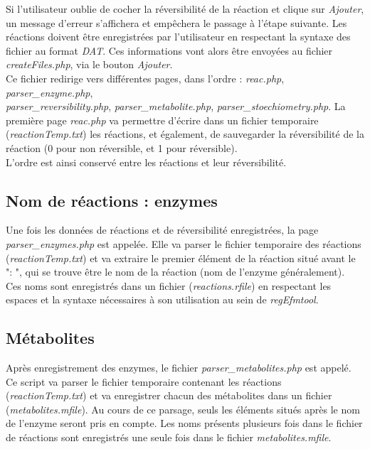 Si l'utilisateur oublie de cocher la réversibilité de la réaction et clique sur \emph{Ajouter}, un message d'erreur s'affichera et empêchera le passage à l'étape suivante. Les réactions doivent être enregistrées par l'utilisateur en respectant la syntaxe des fichier au format \emph{DAT}. Ces informations vont alors être envoyées au fichier \emph{createFiles.php}, via le bouton \emph{Ajouter}.\\
Ce fichier redirige vers différentes pages, dans l'ordre : \emph{reac.php}, \emph{parser\_enzyme.php},
\\ \emph{parser\_reversibility.php}, \emph{parser\_metabolite.php}, \emph{parser\_stoechiometry.php}.
La première page \emph{reac.php} va permettre d'écrire dans un fichier temporaire (\emph{reactionTemp.txt}) les réactions, et également, de sauvegarder la réversibilité de la réaction (0 pour non réversible, et 1 pour réversible).\\
L'ordre est ainsi conservé entre les réactions et leur réversibilité.

\subsection{Nom de réactions : enzymes}
Une fois les données de réactions et de réversibilité enregistrées, la page \emph{parser\_enzymes.php} est appelée. Elle va parser le fichier temporaire des réactions (\emph{reactionTemp.txt}) et va extraire le premier élément de la réaction situé avant le ": ", qui se trouve être le nom de la réaction (nom de l'enzyme généralement).\\
Ces noms sont enregistrés dans un fichier (\emph{reactions.rfile}) en respectant les espaces et la syntaxe nécessaires à son utilisation au sein de \emph{regEfmtool}.

\subsection{Métabolites}
Après enregistrement des enzymes, le fichier \emph{parser\_metabolites.php} est appelé. Ce script va parser le fichier temporaire contenant les réactions (\emph{reactionTemp.txt}) et va enregistrer chacun des métabolites dans un fichier (\emph{metabolites.mfile}). Au cours de ce parsage, seuls les éléments situés après le nom de l'enzyme seront pris en compte. Les noms présents plusieurs fois dans le fichier de réactions sont enregistrés une seule fois dans le fichier \emph{metabolites.mfile}.

